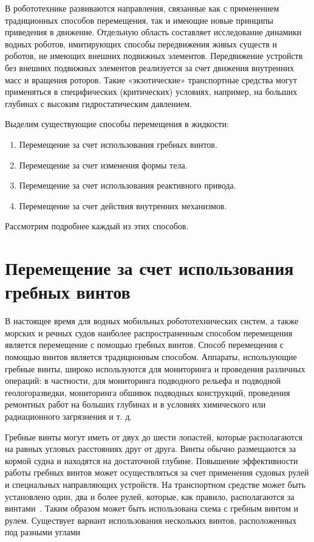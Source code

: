 В робототехнике развиваются направления, связанные как с применением традиционных способов перемещения, так и имеющие новые принципы приведения в движение. Отдельную область составляет исследование динамики водных роботов, имитирующих способы передвижения живых существ и роботов, не имеющих внешних подвижных элементов. Передвижение устройств без внешних подвижных элементов реализуется за счет движения внутренних масс и вращения роторов. Такие «экзотические» транспортные средства могут применяться в специфических (критических) условиях, например, на больших глубинах с высоким гидростатическим давлением.

Выделим существующие способы перемещения в жидкости:

\begin{enumerate}
	\item Перемещение за счет использования гребных винтов.
	\item Перемещение за счет изменения формы тела.
	\item Перемещение за счет использования реактивного привода.
	\item Перемещение за счет действия внутренних механизмов.
\end{enumerate}

Рассмотрим подробнее каждый из этих способов.

\section{Перемещение за счет использования гребных винтов}\label{sec:ch1/sec2}

В настоящее время для водных мобильных робототехнических систем, а также морских и речных судов наиболее распространенным способом перемещения является перемещение с помощью гребных винтов. Способ перемещения с помощью винтов является традиционным способом. Аппараты, использующие гребные винты, широко используются для мониторинга и проведения различных операций: в частности, для мониторинга подводного рельефа и подводной геологоразведки, мониторинга обшивок подводных конструкций, проведения ремонтных работ на больших глубинах и в условиях химического или радиационного загрязнения и т. д. 

Гребные винты могут иметь от двух до шести лопастей, которые располагаются на равных угловых расстояниях друг от друга. Винты обычно размещаются за кормой судна и находятся на достаточной глубине. Повышение эффективности работы гребных винтов может осуществляться за счет применения судовых рулей и специальных направляющих устройств. На транспортном средстве может быть установлено один, два и более рулей, которые, как правило, располагаются за винтами~\cite{Basin_Anfimov_1961}. Таким образом может быть использована схема с гребным винтом и рулем. Существует вариант использования нескольких винтов, расположенных под разными углами~\cite{Lebedev_Pershits_1969, Gornak_MMT3000}

